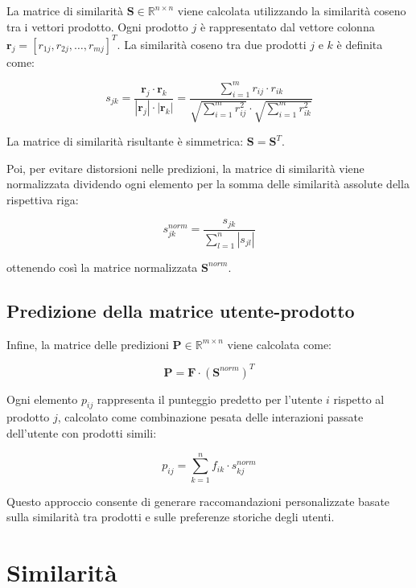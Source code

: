 La matrice di similarità $\mathbf{S} \in \mathbb{R}^{n \times n}$ viene calcolata utilizzando la similarità coseno tra i vettori prodotto. Ogni prodotto $j$ è rappresentato dal vettore colonna $\mathbf{r}_j = [r_{1j}, r_{2j}, \ldots, r_{mj}]^T$. La similarità coseno tra due prodotti $j$ e $k$ è definita come:

\begin{equation}
s_{jk} = \frac{\mathbf{r}_j \cdot \mathbf{r}_k}{|\mathbf{r}_j| \cdot |\mathbf{r}_k|} = \frac{\sum_{i=1}^{m} r_{ij} \cdot r_{ik}}{\sqrt{\sum_{i=1}^{m} r_{ij}^2} \cdot \sqrt{\sum_{i=1}^{m} r_{ik}^2}}
\end{equation}

La matrice di similarità risultante è simmetrica: $\mathbf{S} = \mathbf{S}^T$.

Poi, per evitare distorsioni nelle predizioni, la matrice di similarità viene normalizzata dividendo ogni elemento per la somma delle similarità assolute della rispettiva riga:

\begin{equation}
s_{jk}^{norm} = \frac{s_{jk}}{\sum_{l=1}^{n} |s_{jl}|}
\end{equation}

ottenendo così la matrice normalizzata $\mathbf{S}^{norm}$.

\subsection{Predizione della matrice utente-prodotto}

Infine, la matrice delle predizioni $\mathbf{P} \in \mathbb{R}^{m \times n}$ viene calcolata come:

\begin{equation}
\mathbf{P} = \mathbf{F} \cdot (\mathbf{S}^{norm})^T
\end{equation}

Ogni elemento $p_{ij}$ rappresenta il punteggio predetto per l'utente $i$ rispetto al prodotto $j$, calcolato come combinazione pesata delle interazioni passate dell'utente con prodotti simili:

\begin{equation}
p_{ij} = \sum_{k=1}^{n} f_{ik} \cdot s_{kj}^{norm}
\end{equation}

Questo approccio consente di generare raccomandazioni personalizzate basate sulla similarità tra prodotti e sulle preferenze storiche degli utenti.


\section{Similarità}

